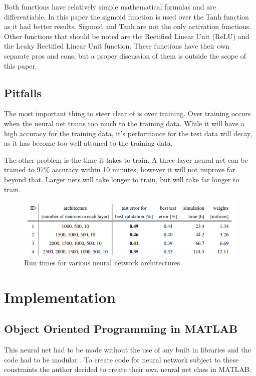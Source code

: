 \documentclass[12pt]{article}
\begin{document}
	Both functions have relatively simple mathematical formulas and are differentiable. In this paper the sigmoid function is used over the Tanh function as it had better results. Sigmoid and Tanh are not the only activation functions. Other functions that should be noted are the Rectified Linear Unit (ReLU) and the Leaky Rectified Linear Unit function. These functions have their own separate pros and cons, but a proper discussion of them is outside the scope of this paper. 
	
	\subsection{Pitfalls}
	The most important thing to steer clear of is over training. Over training occurs when the neural net trains too much to the training data. While it will have a high accuracy for the training data, it's performance for the test data will decay, as it has become too well attuned to the training data.  \par 
	
	The other problem is the time it takes to train. A three layer neural net can be trained to 97\% accuracy within 10 minutes, however it will not improve far beyond that. Larger nets will take longer to train, but will take far longer to train. 
	
	\begin{figure}
		\centering
		\includegraphics[width=0.7\linewidth]{nnRunTime}
		\caption{Run times for various neural network architectures\cite{deepBig}.}
		\label{fig:nnruntime}
	\end{figure}
	
	\section{Implementation}
	\subsection{Object Oriented Programming in MATLAB}
	This neural net had to be made without the use of any built in libraries \cite{Hicken18gradProjDes} and the code had to be modular \cite{Hicken18gradProjRubric}. To create code for neural network subject to these constraints the author decided to create their own neural net class in MATLAB. \par 
	
\end{document}
